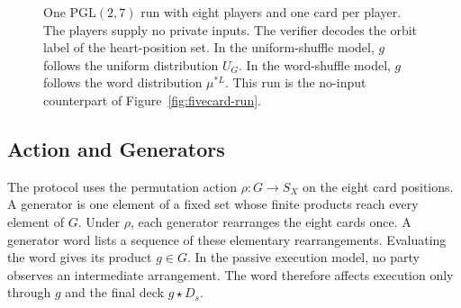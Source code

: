 \documentclass[runningheads]{llncs}
\newcommand{\PG}{\mathrm{PGL}(2,7)}
\newcommand{\worddist}{\mu^{*L}}
\begin{document}
\begin{figure}[H]
  \centering
  \caption{One $\PG$ run with eight players and one card per player. The players supply
no private inputs. The verifier decodes the orbit label of the heart-position
set. In the uniform-shuffle model, $g$ follows the uniform distribution $U_G$.
In the word-shuffle model, $g$ follows the word distribution $\worddist$. This
run is the no-input counterpart of Figure~\ref{fig:fivecard-run}.}
  \label{fig:run}
\end{figure}

\subsection{Action and Generators}

The protocol uses the permutation action $\rho:G\to S_X$ on the eight card
positions. A generator is one element of a fixed set whose finite products
reach every element of $G$. Under $\rho$, each generator rearranges the eight
cards once. A generator word lists a sequence of these elementary
rearrangements. Evaluating the word gives its product $g\in G$. In the passive
execution model, no party observes an intermediate arrangement. The word
therefore affects execution only through $g$ and the final deck $g\star D_s$.
\end{document}
